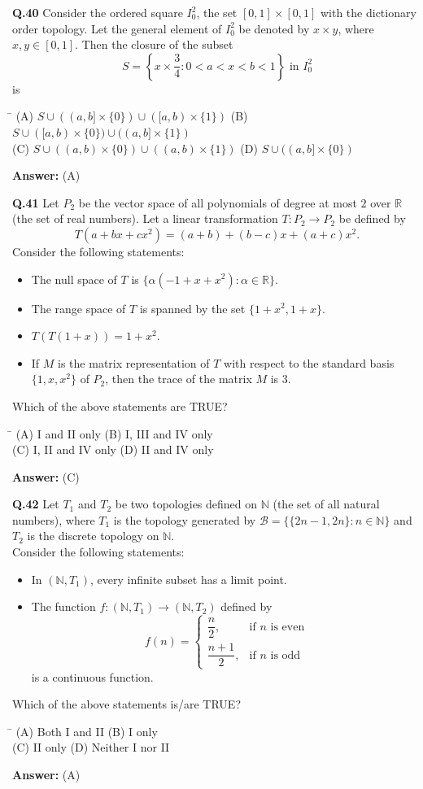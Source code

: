 \documentclass[11pt,a4paper]{article}
\newcommand{\optsfourA}[4]{%
  \begin{tabbing}
    \hspace{0.48\linewidth}\=\kill
    (A) #1 \> (B) #2 \\[2pt]
    (C) #3 \> (D) #4
  \end{tabbing}%
}
\newcommand{\ans}[1]{\textbf{Answer:} #1\par\medskip}
\begin{document}
\textbf{Q.40} Consider the ordered square $I_0^2$, the set $[0, 1] \times [0, 1]$ with the dictionary order topology. Let the general element of $I_0^2$ be denoted by $x \times y$, where $x, y \in [0, 1]$. Then the closure of the subset
\[
  S = \left\{x \times \frac{3}{4} : 0 < a < x < b < 1\right\} \text{ in } I_0^2
\]
is
\optsfourA{$S \cup ((a, b] \times \{0\}) \cup ([a, b) \times \{1\})$}{$S \cup ([a, b) \times \{0\}) \cup ((a, b] \times \{1\})$}{$S \cup ((a, b) \times \{0\}) \cup ((a, b) \times \{1\})$}{$S \cup ((a, b] \times \{0\})$}
\ans{(A)}

\textbf{Q.41} Let $P_2$ be the vector space of all polynomials of degree at most $2$ over $\mathbb{R}$ (the set of real numbers). Let a linear transformation $T : P_2 \to P_2$ be defined by
\[
  T(a + bx + cx^2) = (a + b) + (b - c)x + (a + c)x^2.
\]
Consider the following statements:
\begin{itemize}
  \setlength{\itemsep}{1pt}\setlength{\parskip}{0pt}
  \item[I.] The null space of $T$ is $\{\alpha(-1 + x + x^2) : \alpha \in \mathbb{R}\}$.
  \item[II.] The range space of $T$ is spanned by the set $\{1 + x^2, 1 + x\}$.
  \item[III.] $T(T(1 + x)) = 1 + x^2$.
  \item[IV.] If $M$ is the matrix representation of $T$ with respect to the standard basis $\{1, x, x^2\}$ of $P_2$, then the trace of the matrix $M$ is $3$.
\end{itemize}
Which of the above statements are TRUE?
\optsfourA{I and II only}{I, III and IV only}{I, II and IV only}{II and IV only}
\ans{(C)}

\textbf{Q.42} Let $T_1$ and $T_2$ be two topologies defined on $\mathbb{N}$ (the set of all natural numbers), where $T_1$ is the topology generated by $\mathcal{B} = \{\{2n - 1, 2n\} : n \in \mathbb{N}\}$ and $T_2$ is the discrete topology on $\mathbb{N}$.\\
Consider the following statements:
\begin{itemize}
  \setlength{\itemsep}{1pt}\setlength{\parskip}{0pt}
  \item[I.] In $(\mathbb{N}, T_1)$, every infinite subset has a limit point.
  \item[II.] The function $f : (\mathbb{N}, T_1) \to (\mathbb{N}, T_2)$ defined by
  \[
    f(n) = \begin{cases} \dfrac{n}{2}, & \text{if } n \text{ is even} \\[6pt] \dfrac{n + 1}{2}, & \text{if } n \text{ is odd} \end{cases}
  \]
  is a continuous function.
\end{itemize}
Which of the above statements is/are TRUE?
\optsfourA{Both I and II}{I only}{II only}{Neither I nor II}
\ans{(A)}
\end{document}
